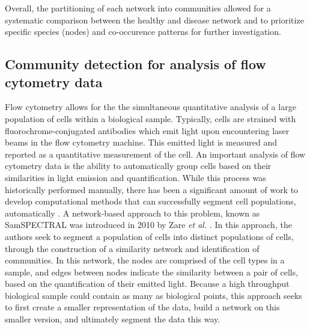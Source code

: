 \indent Overall, the partitioning of each network into communities allowed for a systematic comparison between the healthy and disease network and to prioritize specific species (nodes) and co-occurence patterns for further investigation. 

\subsection{Community detection for analysis of flow cytometry data}
\indent Flow cytometry allows for the the simultaneous quantitative analysis of a large population of cells within a biological sample. Typically, cells are strained with fluorochrome-conjugated antibodies which emit light upon encountering laser beams in the flow cytometry machine. This emitted light is measured and reported as a quantitative measurement of the cell. An important analysis of flow cytometry data is the ability to automatically group cells based on their similarities in light emission and quantification. While this process was historically performed manually, there has been a significant amount of work to develop computational methods that can successfully segment cell populations, automatically \cite{nimaFlow}. A network-based approach to this problem, known as SamSPECTRAL was introduced in 2010 by Zare \emph{et al.} \cite{FlowSpectral}. In this approach, the authors seek to segment a population of cells into distinct populations of cells, through the construction of a similarity network and identification of communities. In this network, the nodes are comprised of the cell types in a sample, and edges between nodes indicate the similarity between a pair of cells, based on the quantification of their emitted light. Because a high throughput biological sample could contain as many as biological points, this approach seeks to first create a smaller representation of the data, build a network on this smaller version, and ultimately segment the data this way. \\
